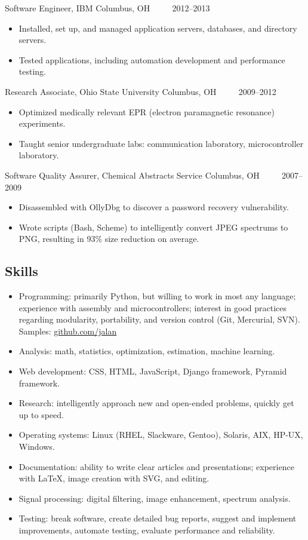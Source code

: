 \documentclass[12pt]{report}
\begin{document}
Software Engineer, IBM \hfill Columbus, OH ~~~~ 2012--2013
\begin{itemize}
\item Installed, set up, and managed application servers, databases, and directory servers.
\item Tested applications, including automation development and performance testing.
\\
\end{itemize}

Research Associate, Ohio State University \hfill Columbus, OH ~~~~ 2009--2012
\begin{itemize}
\item Optimized medically relevant EPR (electron paramagnetic resonance) experiments.
\item Taught senior undergraduate labs: communication laboratory, microcontroller laboratory.
\\
\end{itemize}

Software Quality Assurer, Chemical Abstracts Service \hfill Columbus, OH ~~~~ 2007--2009
\begin{itemize}
\item Disassembled with OllyDbg to discover a password recovery vulnerability.
\item Wrote scripts (Bash, Scheme) to intelligently convert JPEG spectrums to PNG, resulting in 93\% size reduction on average.
\end{itemize}

\subsection*{Skills}
\begin{itemize}
\item Programming: primarily Python, but willing to work in most any language; experience with assembly and microcontrollers; interest in good practices regarding modularity, portability, and version control (Git, Mercurial, SVN). Samples: \href{http://github.com/jalan}{github.com/jalan}
\item Analysis: math, statistics, optimization, estimation, machine learning.
\item Web development: CSS, HTML, JavaScript, Django framework, Pyramid framework.
\item Research: intelligently approach new and open-ended problems, quickly get up to speed.
\item Operating systems: Linux (RHEL, Slackware, Gentoo), Solaris, AIX, HP-UX, Windows.
\item Documentation: ability to write clear articles and presentations; experience with \LaTeX, image creation with SVG, and editing.
\item Signal processing: digital filtering, image enhancement, spectrum analysis.
\item Testing: break software, create detailed bug reports, suggest and implement improvements, automate testing, evaluate performance and reliability.
\end{itemize}
\end{document}
